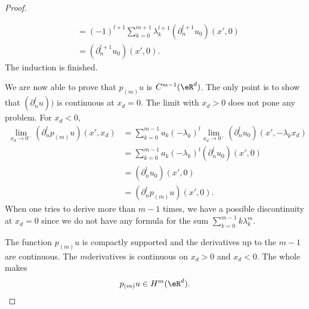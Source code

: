 \begin{proof}
\begin{subproof}
\begin{subequations}
\begin{align}
				                                                                                   & =(-1)^{l+1}\sum_{k=0}^{m+1}\lambda_k^{l+1}(\partial_n^{l+1}u_0)(x',0)                                                            \\
				                                                                                   & =(\partial^{l+1}_nu_0)(x',0).
			\end{align}
		\end{subequations}
		The induction is finished.
	\end{subproof}
	We are now able to prove that \( p_{(m)}u\) is \( C^{m-1}(\eR^d)\). The only point is to show that \( (\partial^l_nu))\) is continuous at \( x_d=0\). The limit with \( x_d>0\) does not pone any problem. For \( x_d<0\),
	\begin{subequations}
		\begin{align}
			\lim_{x_d\to 0^-}(\partial_n^lp_{(m)}u)(x',x_d) & =\sum_{k=0}^{m-1}a_k(-\lambda_k)^l\lim_{x_d\to 0^-}(\partial_n^lu_0)(x',-\lambda_kx_d) \\
			                                                & =\sum_{k=0}^{m-1}a_k(-\lambda_k)^l(\partial_n^lu_0)(x',0)                              \\
			                                                & =(\partial_n^lu_0)(x',0)                                                               \\
			                                                & =(\partial^l_np_{(m)}u)(x',0).
		\end{align}
	\end{subequations}
	When one tries to derive more than \( m-1\) times, we have a possible discontinuity at \( x_d=0\) since we do not have any formula for the sum \( \sum_{k=0}^{m-1}k\lambda_k^m\).

	The function \(p_{(m)}u\) is compactly supported and the derivatives up to the \( m-1\)\ieme are continuous. The \( m\)\ieme derivatives is continuous on \( x_d>0\) and \( x_d<0\). The whole makes
	\begin{equation}
		p_{(m)}u\in H^m(\eR^d).
	\end{equation}


\end{proof}
